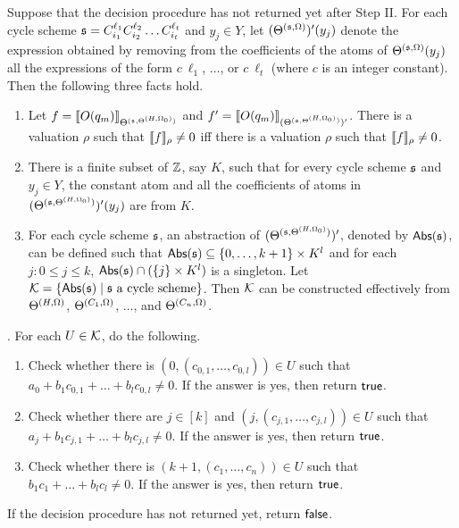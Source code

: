 \begin{proposition}\label{prop-bnd-domain}
Suppose that the decision procedure has not returned yet after Step II. For each cycle scheme ${\mathfrak{s} }=C_{i_1}^{\ell_1} C_{i_2}^{\ell_2} \dots C_{i_t}^{\ell_t}$ and $y_j \in Y$, let $(\Theta^{({\mathfrak{s} },\Omega)})'(y_j)$ denote the expression obtained by removing from the coefficients of the atoms of $\Theta^{({\mathfrak{s} },\Omega)}(y_j)$ all the expressions of the form $c\ \ell_1$, $\dots$, or $c\ \ell_t$ (where $c$ is an integer constant).  Then the following three facts hold.
\begin{enumerate}
\item Let $f=\llbracket O(q_m)\rrbracket_{\Theta^{({\mathfrak{s} }, \Theta^{(H,\Omega_0)})}}$ and $f'=\llbracket O(q_m)\rrbracket_{(\Theta^{({\mathfrak{s} }, \Theta^{(H,\Omega_0)})})'}$.
There is a valuation $\rho$ such that $\llbracket f\rrbracket_{\rho}\neq 0$ iff there is a valuation $\rho$ such that $\llbracket f\rrbracket_{\rho} \neq 0$.
%
\item There is a finite subset of ${\mathbb{Z} }$, say $K$, such that for every cycle scheme ${\mathfrak{s} }$ and $y_j \in Y$, the constant atom and all the coefficients of atoms in $(\Theta^{({\mathfrak{s} }, \Theta^{(H,\Omega_0)})})'(y_j)$ are from $K$. 
%
\item For each cycle scheme ${\mathfrak{s} }$, an abstraction of $(\Theta^{({\mathfrak{s} }, \Theta^{(H,\Omega_0)})})'$, denoted by $\mathsf{Abs}({\mathfrak{s} })$, can be defined such that $\mathsf{Abs}({\mathfrak{s} }) \subseteq \{0,\dots, k+1\} \times K^l$ and for each $j: 0 \le j \le k$,  $\mathsf{Abs}({\mathfrak{s} }) \cap (\{j\} \times K^l)$ is a singleton. Let ${\mathcal{K}}=\{\mathsf{Abs}({\mathfrak{s} }) \mid {\mathfrak{s} } \mbox{ a cycle scheme}\}$. Then ${\mathcal{K}}$ can be constructed effectively from $\Theta^{(H,\Omega)}$, $\Theta^{(C_1,\Omega)}$, $\dots$, and $\Theta^{(C_n,\Omega)}$.
\end{enumerate}
\end{proposition}


. For each $U \in {\mathcal{K}}$, do the following.
\begin{enumerate}
\item Check whether there is $(0,(c_{0,1},\dots,c_{0,l})) \in U$ such that $a_0+b_1 c_{0,1}+\dots + b_l c_{0,l} \neq 0$. If the answer is yes, then return $\mathsf{true}$.
%
\item Check whether there are $j \in [k]$ and $(j, (c_{j,1},\dots,c_{j,l})) \in U$ such that $a_j + b_1 c_{j,1} + \dots + b_l c_{j,l} \neq 0$. If the answer is yes, then return $\mathsf{true}$. 
%
\item Check whether there is $(k+1,(c_1,\dots,c_n)) \in U$ such that $b_1 c_1 + \dots + b_l c_l \neq 0$. If the answer is yes, then return $\mathsf{true}$. 
\end{enumerate}
If the decision procedure has not returned yet, return $\mathsf{false}$.


